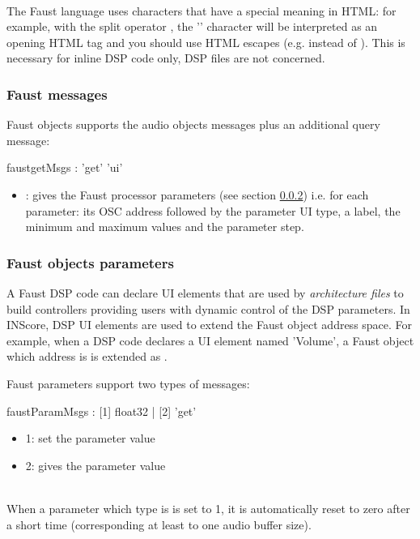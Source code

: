 \documentclass[a4paper,twoside]{article}
\newcommand{\subsublevel}[1]	{\subsubsection{#1}}
\begin{document}
\note{}\\
The Faust language uses characters that have a special meaning in HTML: for example, with the split operator \OSC{<:}, the '\OSC{<}' character will be interpreted as an opening HTML tag and you should use HTML escapes (e.g.  instead of \OSC{<}). This is necessary for inline DSP code only, DSP files are not concerned.

\subsublevel{Faust messages}
\label{webFaustMsgs}

Faust objects supports the audio objects messages plus an additional query message:

\begin{rail}
faustgetMsgs : 'get' 'ui'
\end{rail}

\begin{itemize}
\item {}: gives the Faust processor parameters (see section \ref{webFaustParams}) i.e. for each parameter: its OSC address followed by the parameter UI type, a label, the minimum and maximum values and the parameter step.
\end{itemize}


\subsublevel{Faust objects parameters}
\label{webFaustParams}

A Faust DSP code can declare UI elements that are used by \emph{architecture files} to build controllers providing users with dynamic control of the DSP parameters. In INScore, DSP UI elements are used to extend the Faust object address space. For example, when a DSP code declares a UI element named 'Volume', a Faust object which address is  is extended as .

Faust parameters support two types of messages:

\begin{rail}
faustParamMsgs : [1] float32 | [2] 'get'
\end{rail}

\begin{itemize}
\item 1: set the parameter value
\item 2: gives the parameter value
\end{itemize}

\note{}\\
When a parameter which type is  is set to 1, it is automatically reset to zero after a short time (corresponding at least to one audio buffer size).
\end{document}
